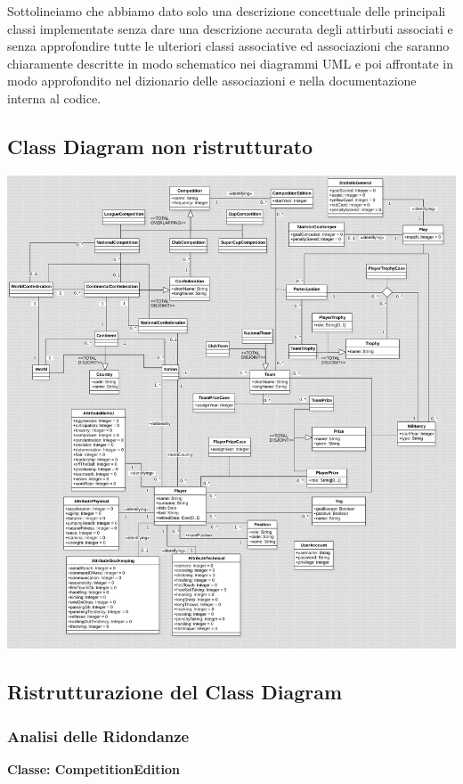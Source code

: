 Sottolineiamo che abbiamo dato solo una descrizione concettuale delle principali classi
implementate senza dare una descrizione accurata degli attirbuti associati e senza approfondire
tutte le ulteriori classi associative ed associazioni che saranno chiaramente descritte
in modo schematico nei diagrammi UML e poi affrontate in modo approfondito nel dizionario
delle associazioni e nella documentazione interna al codice.
\newpage
\subsection{Class Diagram non ristrutturato}

\includegraphics[width=\textwidth]{res/class_diagram_not_ristr}
\newpage

\subsection{Ristrutturazione del Class Diagram}

\subsubsection{Analisi delle Ridondanze}

\textbf{Classe: CompetitionEdition}

